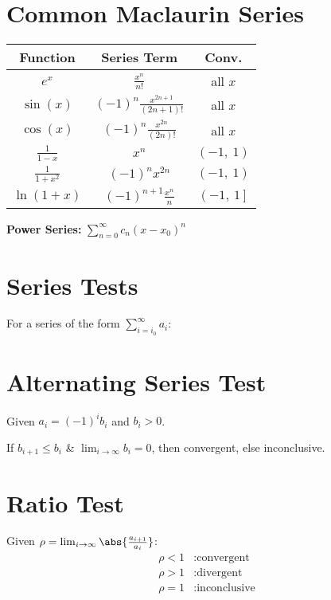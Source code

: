 \documentclass{article}
\begin{document}
\begin{multicols}{3}
    \section*{Common Maclaurin Series}
    \begin{table}[H]
        \centering
        \begin{tabular}{c c c}
            \toprule
            \textbf{Function}           & \textbf{Series Term}                                          & \textbf{Conv.}             \\
            \midrule
            \(e^{x}\)                   & \(\frac{x^n}{n!}\)                                            & all \(x\)                  \\
            \(\sin{\left( x \right)}\)  & \(\left( -1 \right)^n \frac{x^{2n+1}}{\left( 2n+1 \right)!}\) & all \(x\)                  \\
            \(\cos{\left( x \right)}\)  & \(\left( -1 \right)^n \frac{x^{2n}}{\left( 2n \right)!}\)     & all \(x\)                  \\
            \(\frac{1}{1-x}\)           & \(x^n\)                                                       & \(\left( -1,\: 1 \right)\) \\
            \(\frac{1}{1+x^2}\)         & \(\left( -1 \right)^n x^{2n}\)                                & \(\left( -1,\: 1 \right)\) \\
            \(\ln{\left( 1+x \right)}\) & \(\left( -1 \right)^{n+1} \frac{x^n}{n}\)                     & \(\left( -1,\: 1 \right]\) \\
            \bottomrule
        \end{tabular}
    \end{table}
    \textbf{Power Series:} \(\sum_{n=0}^{\infty} c_n\left( x-x_0 \right)^n\)
    \section*{Series Tests}
    For a series of the form \(\displaystyle\sum_{i=i_0}^\infty a_i\):
    \section*{Alternating Series Test}
    Given \(a_i = \left( -1 \right)^i b_i\) and \(b_i>0\).

    If \(b_{i+1}\leqslant b_i\) \& \(\lim_{i\to\infty}b_i=0\), then
    convergent, else inconclusive. \section*{Ratio Test} Given \(\rho =
    \lim_{i\to\infty}\abs{\frac{a_{i+1}}{a_i}}\):
    \begin{align*}
        \rho < 1 & : \text{convergent}   \\
        \rho > 1 & : \text{divergent}    \\
        \rho = 1 & : \text{inconclusive}
    \end{align*}

\end{multicols}
\end{document}
